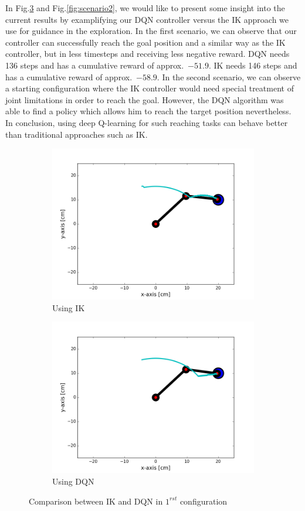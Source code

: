 \documentclass{article}
\begin{document}
\vspace{\baselineskip}

In Fig.\ref{fig:scenario1} and Fig.\ref{fig:scenario2}, we would like to present some insight into the current results by examplifying our DQN controller versus the IK approach we use for guidance in the exploration. In the first scenario, we can observe that our controller can successfully reach the goal position and a similar way as the IK controller, but in less timesteps and receiving less negative reward. DQN needs 136 steps and has a cumulative reward of approx.~$-51.9$. IK needs 146 steps and has a cumulative reward of approx.~$-58.9$. In the second scenario, we can observe a starting configuration where the IK controller would need special treatment of joint limitations in order to reach the goal. However, the DQN algorithm was able to find a policy which allows him to reach the target position nevertheless. In conclusion, using deep Q-learning for such reaching tasks can behave better than traditional approaches such as IK. 

\begin{figure}[H]
\begin{subfigure}{.5\textwidth}
  \centering
  \includegraphics[width=.8\linewidth]{reportpics/scene1ik.png}
  \caption{Using IK}
  \label{fig:scenario1_ik}
\end{subfigure}%
\begin{subfigure}{.5\textwidth}
  \centering
  \includegraphics[width=.8\linewidth]{reportpics/scene1dqn.png}
  \caption{Using DQN}
  \label{fig:scenario1_dqn}
\end{subfigure}
\caption{Comparison between IK and DQN in $1^{rst}$ configuration}
\label{fig:scenario1}
\end{figure}
\end{document}
